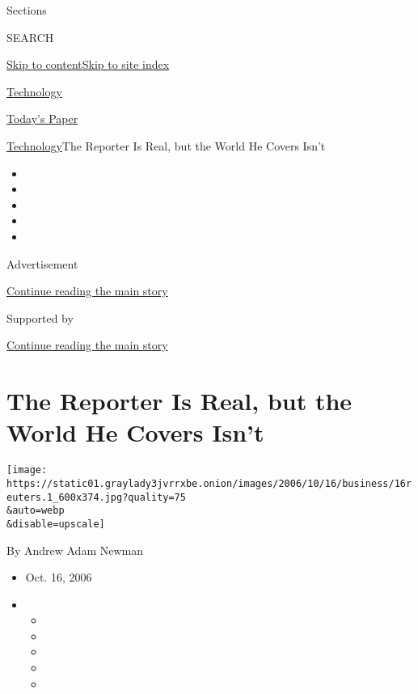 Sections

SEARCH

\protect\hyperlink{site-content}{Skip to
content}\protect\hyperlink{site-index}{Skip to site index}

\href{https://www.nytimes3xbfgragh.onion/section/technology}{Technology}

\href{https://myaccount.nytimes3xbfgragh.onion/auth/login?response_type=cookie\&client_id=vi}{}

\href{https://www.nytimes3xbfgragh.onion/section/todayspaper}{Today's
Paper}

\href{/section/technology}{Technology}\textbar{}The Reporter Is Real,
but the World He Covers Isn't

\begin{itemize}
\item
\item
\item
\item
\item
\end{itemize}

Advertisement

\protect\hyperlink{after-top}{Continue reading the main story}

Supported by

\protect\hyperlink{after-sponsor}{Continue reading the main story}

\hypertarget{the-reporter-is-real-but-the-world-he-covers-isnt}{%
\section{The Reporter Is Real, but the World He Covers
Isn't}\label{the-reporter-is-real-but-the-world-he-covers-isnt}}

\texttt{[image: https://static01.graylady3jvrrxbe.onion/images/2006/10/16/business/16reuters.1\_600x374.jpg?quality=75\\\&auto=webp\\\&disable=upscale]}

By Andrew Adam Newman

\begin{itemize}
\item
  Oct. 16, 2006
\item
  \begin{itemize}
  \item
  \item
  \item
  \item
  \item
  \end{itemize}
\end{itemize}

